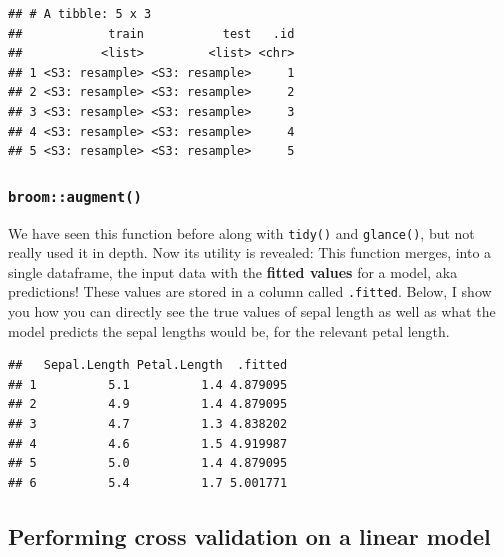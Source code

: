 \documentclass[]{article}
\newenvironment{Shaded}{\begin{snugshade}}{\end{snugshade}}
\newcommand{\KeywordTok}[1]{\textcolor[rgb]{0.13,0.29,0.53}{\textbf{#1}}}
\newcommand{\DataTypeTok}[1]{\textcolor[rgb]{0.13,0.29,0.53}{#1}}
\newcommand{\StringTok}[1]{\textcolor[rgb]{0.31,0.60,0.02}{#1}}
\newcommand{\OperatorTok}[1]{\textcolor[rgb]{0.81,0.36,0.00}{\textbf{#1}}}
\newcommand{\NormalTok}[1]{#1}
\begin{document}
\begin{verbatim}
## # A tibble: 5 x 3
##            train           test   .id
##           <list>         <list> <chr>
## 1 <S3: resample> <S3: resample>     1
## 2 <S3: resample> <S3: resample>     2
## 3 <S3: resample> <S3: resample>     3
## 4 <S3: resample> <S3: resample>     4
## 5 <S3: resample> <S3: resample>     5
\end{verbatim}

\subsubsection{\texorpdfstring{\texttt{broom::augment()}}{broom::augment()}}\label{broomaugment}

We have seen this function before along with \texttt{tidy()} and
\texttt{glance()}, but not really used it in depth. Now its utility is
revealed: This function merges, into a single dataframe, the input data
with the \textbf{fitted values} for a model, aka predictions! These
values are stored in a column called \texttt{.fitted}. Below, I show you
how you can directly see the true values of sepal length as well as what
the model predicts the sepal lengths would be, for the relevant petal
length.

\begin{Shaded}
\end{Shaded}

\begin{verbatim}
##   Sepal.Length Petal.Length  .fitted
## 1          5.1          1.4 4.879095
## 2          4.9          1.4 4.879095
## 3          4.7          1.3 4.838202
## 4          4.6          1.5 4.919987
## 5          5.0          1.4 4.879095
## 6          5.4          1.7 5.001771
\end{verbatim}

\subsection{Performing cross validation on a linear
model}\label{performing-cross-validation-on-a-linear-model}
\end{document}
